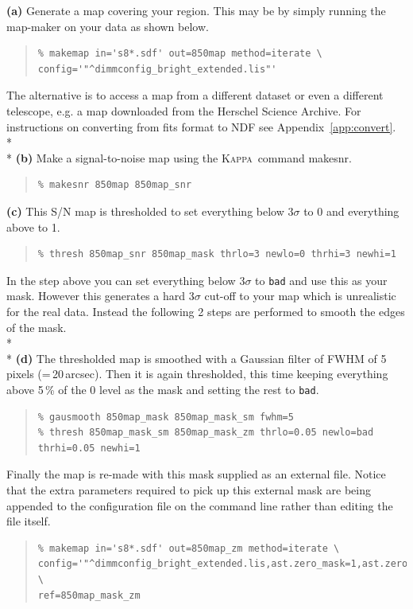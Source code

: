 \documentclass[twoside,11pt]{article}
\newcommand{\htmlref}[2]{#1}
\newcommand{\latexhtml}[2]{#1}
\newcommand{\xref}[3]{#1}
\renewcommand{\_}{\texttt{\symbol{95}}}
\newenvironment{myquote}{\begin{quote}\begin{small}}{\end{small}\end{quote}}
\newcommand{\Kappa}{\xref{\textsc{Kappa}}{sun95}{}}
\newcommand{\task}[1]{\textsf{#1}}
\newcommand{\makesnr}{\xref{\task{makesnr}}{sun95}{MAKESNR}}
\newcommand{\cref}[3]{\latexhtml{#1~\ref{#2}}{\htmlref{#3}{#2}}}
\begin{document}
\textbf{(a)} Generate a map covering your region. This may be by simply
running the map-maker on your data as shown below.
\begin{myquote}
\begin{verbatim}
% makemap in='s8*.sdf' out=850map method=iterate \
config='"^dimmconfig_bright_extended.lis"'
\end{verbatim}
\end{myquote}
The alternative is to access a map from a different dataset or even a
different telescope, e.g. a map downloaded from the Herschel Science
Archive. For instructions on converting from fits format to NDF see
\cref{Appendix}{app:convert}{Converting a Herschel map to NDF}.
\\*\\*
\textbf{(b)} Make a signal-to-noise map using the \Kappa\ command \makesnr.
\begin{myquote}
\begin{verbatim}
% makesnr 850map 850map_snr
\end{verbatim}
\end{myquote}
\textbf{(c)} This S/N map is thresholded to set everything below 3$\sigma$ to 0 and
everything above to 1.
\begin{myquote}
\begin{verbatim}
% thresh 850map_snr 850map_mask thrlo=3 newlo=0 thrhi=3 newhi=1
\end{verbatim}
\end{myquote}
In the step above you can set everything below 3$\sigma$ to
\texttt{bad} and use this as your mask. However this generates a hard
3$\sigma$ cut-off to your map which is unrealistic for the real data.
Instead the following 2 steps are performed to smooth the edges of the
mask.
\\*\\*
\textbf{(d)} The thresholded map is smoothed with a Gaussian filter
of FWHM of 5 pixels (=\,20\,arcsec). Then it is again thresholded, this time
keeping everything above 5\,\% of the 0 level as the mask and setting
the rest to \texttt{bad}.
\begin{myquote}
\begin{verbatim}
% gausmooth 850map_mask 850map_mask_sm fwhm=5
% thresh 850map_mask_sm 850map_mask_zm thrlo=0.05 newlo=bad thrhi=0.05 newhi=1
\end{verbatim}
\end{myquote}
Finally the map is re-made with this mask supplied as an external
file. Notice that the extra parameters required to pick up this external
mask are being appended to the configuration file on the command line
rather than editing the file itself.
\begin{myquote}
\begin{verbatim}
% makemap in='s8*.sdf' out=850map_zm method=iterate \
config='"^dimmconfig_bright_extended.lis,ast.zero_mask=1,ast.zero_snr=0"' \
ref=850map_mask_zm
\end{verbatim}
\end{myquote}
\end{document}
